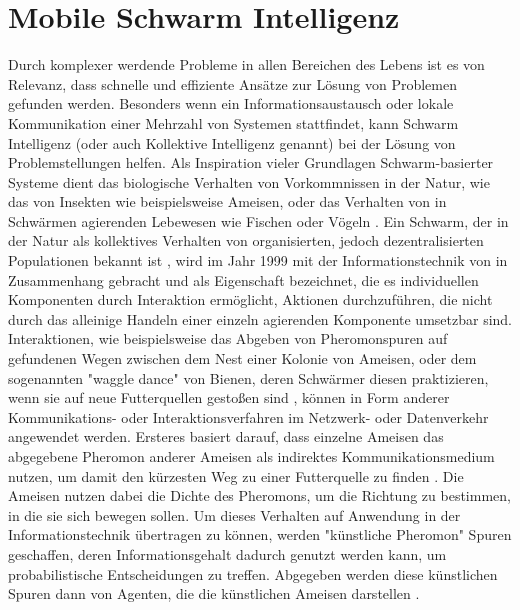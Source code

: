 \section{Mobile Schwarm Intelligenz}
Durch komplexer werdende Probleme in allen Bereichen des Lebens ist es von Relevanz, dass schnelle und effiziente Ansätze zur Lösung von Problemen gefunden werden. Besonders wenn ein Informationsaustausch oder lokale Kommunikation einer Mehrzahl von Systemen stattfindet, kann Schwarm Intelligenz (oder auch Kollektive Intelligenz genannt) bei der Lösung von Problemstellungen helfen. Als Inspiration vieler Grundlagen Schwarm-basierter Systeme dient das biologische Verhalten von Vorkommnissen in der Natur, wie das von Insekten wie beispielsweise Ameisen, oder das Verhalten von in Schwärmen agierenden Lebewesen wie Fischen oder Vögeln \cite{Blum2008}. 
Ein Schwarm, der in der Natur als kollektives Verhalten von organisierten, jedoch dezentralisierten Populationen bekannt ist \cite{Kiranyaz2013}, wird im Jahr 1999 mit der Informationstechnik von \cite{Bonabeau1999} in Zusammenhang gebracht und als Eigenschaft bezeichnet, die es individuellen Komponenten durch Interaktion ermöglicht, Aktionen durchzuführen, die nicht durch das alleinige Handeln einer einzeln agierenden Komponente umsetzbar sind. Interaktionen, wie beispielsweise das Abgeben von Pheromonspuren auf gefundenen Wegen zwischen dem Nest einer Kolonie von Ameisen, oder dem sogenannten "waggle dance" von Bienen, deren Schwärmer diesen praktizieren, wenn sie auf neue Futterquellen gestoßen sind \cite{Blum2008, Panigrahi2011}, können in Form anderer Kommunikations- oder Interaktionsverfahren im Netzwerk- oder Datenverkehr angewendet werden. Ersteres basiert darauf, dass einzelne Ameisen das abgegebene Pheromon anderer Ameisen als indirektes Kommunikationsmedium nutzen, um damit den kürzesten Weg zu einer Futterquelle zu finden \cite{Blum2008}. Die Ameisen nutzen dabei die Dichte des Pheromons, um die Richtung zu bestimmen, in die sie sich bewegen sollen. Um dieses Verhalten auf Anwendung in der Informationstechnik übertragen zu können, werden "künstliche Pheromon" Spuren geschaffen, deren Informationsgehalt dadurch genutzt werden kann, um probabilistische Entscheidungen zu treffen. Abgegeben werden diese künstlichen Spuren dann von Agenten, die die künstlichen Ameisen darstellen \cite{Gendreau2010}.

